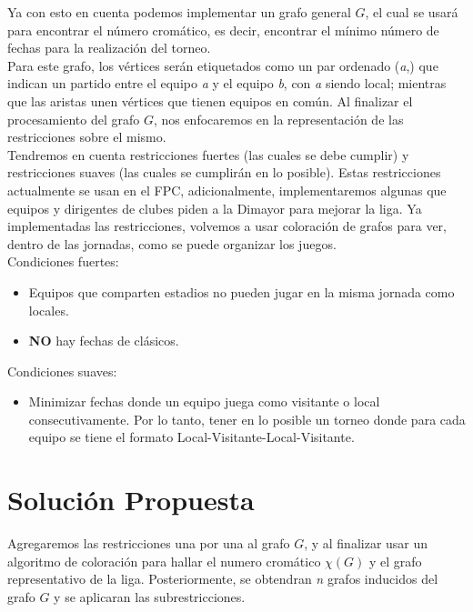 \documentclass[11pt]{article}
\begin{document}
\begin{multicols}{2}
            Ya con esto en cuenta podemos implementar un grafo general $G$, el cual se usará para 
            encontrar el número cromático, es decir, encontrar el mínimo número de fechas para la 
            realización del torneo.\\
            Para este grafo, los vértices serán etiquetados como un par ordenado (\textit{a},) que indican un 
            partido entre el equipo \textit{a} y el equipo \textit{b}, con \textit{a} siendo local; mientras que las aristas unen 
            vértices que tienen equipos en común. Al finalizar el procesamiento del grafo $G$, nos enfocaremos en la representación de las restricciones
            sobre el mismo.\\[10pt]
            Tendremos en cuenta restricciones fuertes (las cuales se debe cumplir) y restricciones 
            suaves (las cuales se cumplirán en lo posible). Estas restricciones 
            actualmente se usan en el FPC, adicionalmente, implementaremos algunas que equipos y 
            dirigentes de clubes piden a la Dimayor para mejorar la liga. Ya implementadas las 
            restricciones, volvemos a usar coloración de grafos para ver, dentro de las jornadas, como 
            se puede organizar los juegos.\\[10pt]
            Condiciones fuertes:
            \begin{itemize}
                \item Equipos que comparten estadios no pueden jugar en la misma jornada como locales.
                \item \textbf{NO} hay fechas de clásicos.
            \end{itemize}
            Condiciones suaves:
            \begin{itemize}  
                \item Minimizar fechas donde un equipo juega como visitante o local consecutivamente. 
                Por lo tanto, tener en lo posible un torneo donde para cada equipo se tiene 
                el formato Local-Visitante-Local-Visitante.     
            \end{itemize}

        \section{Solución Propuesta}
            Agregaremos las restricciones una por una al grafo $G$, y al finalizar usar un algoritmo de coloración para hallar el numero cromático $\chi(G)$ y el grafo
            representativo de la liga. Posteriormente, se obtendran \textit{n} grafos inducidos del grafo $G$ y se aplicaran las subrestricciones. 
        

\end{multicols}
\end{document}

